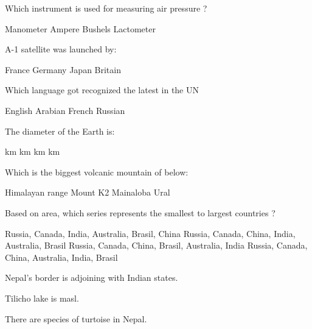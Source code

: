 \begin{questions}
\question Which instrument is used for measuring air pressure ?
  \begin{choices}
  \CorrectChoice Manometer
  \choice Ampere
  \choice Bushels
  \choice Lactometer
  \end{choices}

\question A-1 satellite was launched by:
  \begin{choices}
  \CorrectChoice France
  \choice Germany
  \choice Japan
  \choice Britain
  \end{choices}

\question Which language got recognized the latest in the UN
  \begin{choices}
  \choice English
  \CorrectChoice Arabian
  \choice French
  \choice Russian
  \end{choices}

\question The diameter of the Earth is:
  \begin{choices}
   km
   km
   km
   km
  \end{choices}

\question Which is the biggest volcanic mountain of below:
  \begin{choices}
  \choice Himalayan range
  \choice Mount K2
  \choice Mainaloba
  \choice Ural
  \end{choices}

\question Based on area, which series represents the smallest to largest countries ?
  \begin{choices}
  \choice Russia, Canada, India, Australia, Brasil, China
  \choice Russia, Canada, China, India, Australia, Brasil
  \choice Russia, Canada, China, Brasil, Australia, India
  \choice Russia, Canada, China, Australia, India, Brasil
  \end{choices}

\question Nepal's border is adjoining with \fillin[][2cm] Indian states.
  \begin{choices}
  \end{choices}

\question Tilicho lake is \fillin[][2cm] masl.
  \begin{choices}
  \end{choices}

\question There are \fillin[][2cm] species of turtoise in Nepal.
  \begin{choices}
  \end{choices}


\end{questions}

